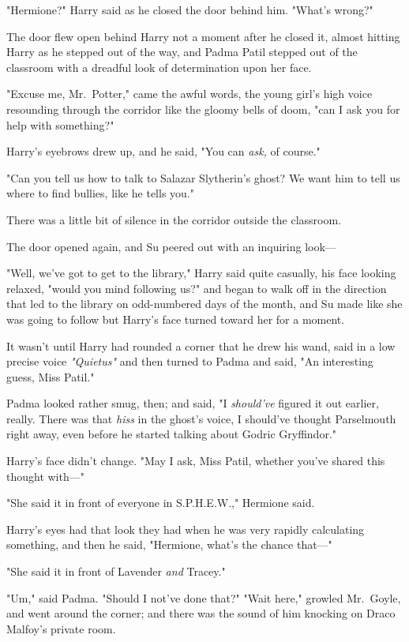 "Hermione?" Harry said as he closed the door behind him. "What's wrong?"

The door flew open behind Harry not a moment after he closed it, almost hitting
Harry as he stepped out of the way, and Padma Patil stepped out of the
classroom with a dreadful look of determination upon her face.

"Excuse me, Mr.~Potter," came the awful words, the young girl's high voice
resounding through the corridor like the gloomy bells of doom, "can I ask you
for help with something?"

Harry's eyebrows drew up, and he said, "You can \emph{ask,} of course."

"Can you tell us how to talk to Salazar Slytherin's ghost? We want him to tell
us where to find bullies, like he tells you."

There was a little bit of silence in the corridor outside the classroom.

The door opened again, and Su peered out with an inquiring look---

"Well, we've got to get to the library," Harry said quite casually, his face
looking relaxed, "would you mind following us?" and began to walk off in the
direction that led to the library on odd-numbered days of the month, and Su
made like she was going to follow but Harry's face turned toward her for a
moment.

It wasn't until Harry had rounded a corner that he drew his wand, said in a low
precise voice \emph{"Quietus"} and then turned to Padma and said, "An
interesting guess, Miss Patil."

Padma looked rather smug, then; and said, "I \emph{should've} figured it out
earlier, really. There was that \emph{hiss} in the ghost's voice, I should've
thought Parselmouth right away, even before he started talking about Godric
Gryffindor."

Harry's face didn't change. "May I ask, Miss Patil, whether you've shared this
thought with\mbox{---}"

"She said it in front of everyone in S.P.H.E.W.," Hermione said.

Harry's eyes had that look they had when he was very rapidly calculating
something, and then he said, "Hermione, what's the chance that\mbox{---}"

"She said it in front of Lavender \emph{and} Tracey."

"Um," said Padma. "Should I not've done that?"
\sbreak
"Wait here," growled Mr.~Goyle, and went around the corner; and there was the
sound of him knocking on Draco Malfoy's private room.

